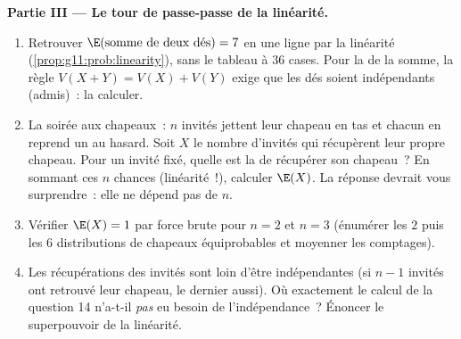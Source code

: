 \begin{problem}
\medskip
\noindent\textbf{Partie III --- Le tour de passe-passe de la
linéarité.}
\begin{enumerate}[resume]
  \item Retrouver $\E(\text{somme de deux dés}) = 7$ en une ligne
        par la linéarité (\cref{prop:g11:prob:linearity}), sans le
        tableau à $36$ cases. Pour la \emph{} de la somme,
        la règle $V(X + Y) = V(X) + V(Y)$ exige que les dés soient
        indépendants (admis)~: la calculer.
  \item La soirée aux chapeaux~: $n$ invités jettent leur chapeau
        en tas et chacun en reprend un au hasard. Soit $X$ le nombre
        d'invités qui récupèrent leur propre chapeau. Pour un invité
        fixé, quelle est la  de récupérer son chapeau~?
        En sommant ces $n$ chances (linéarité~!), calculer $\E(X)$.
        La réponse devrait vous surprendre~: elle ne dépend pas de
        $n$.
  \item Vérifier $\E(X) = 1$ par force brute pour $n = 2$ et
        $n = 3$ (énumérer les $2$ puis les $6$ distributions de
        chapeaux équiprobables et moyenner les comptages).
  \item Les récupérations des invités sont loin d'être
        indépendantes (si $n - 1$ invités ont retrouvé leur chapeau,
        le dernier aussi). Où exactement le calcul de la question 14
        n'a-t-il \emph{pas} eu besoin de l'indépendance~? Énoncer le
        superpouvoir de la linéarité.
\end{enumerate}


\end{problem}
